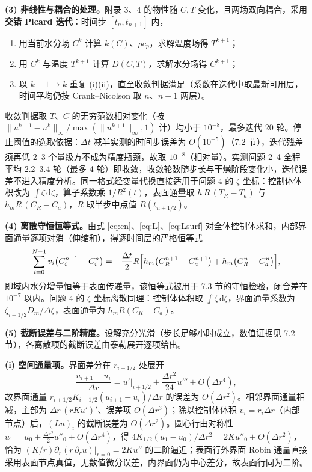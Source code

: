 \documentclass[12pt,a4paper]{ctexart}
\newcommand{\dd}{\,\mathrm{d}}
\begin{document}
\textbf{(3) 非线性与耦合的处理。}附录 3、4 的物性随 $C,T$ 变化，且两场双向耦合，采用\textbf{交错 Picard 迭代}：时间步 $[t_n,t_{n+1}]$ 内，
\begin{enumerate}[label=(\roman*),leftmargin=3em]
\item 用当前水分场 $C^{k}$ 计算 $k(C)$、$\rho c_p$，求解温度场得 $T^{k+1}$；
\item 用 $C^{k}$ 与温度 $T^{k+1}$ 计算 $D(C,T)$，求解水分场得 $C^{k+1}$；
\item 以 $k+1\to k$ 重复 (i)(ii)，直至收敛判据满足（系数在迭代中取最新可用层，时间平均仍按 Crank--Nicolson 取 $n$、$n+1$ 两层）。
\end{enumerate}
收敛判据取 $T$、$C$ 的无穷范数相对变化（按 $\|u^{k+1}-u^k\|_\infty/\max(\|u^{k+1}\|_\infty,1)$ 计）均小于 $10^{-8}$，最多迭代 20 轮。停止阈值的选取依据：$\Delta t$ 减半实测的时间步误差为 $O(10^{-5})$（7.2 节），迭代残差须再低 2--3 个量级方不成为精度瓶颈，故取 $10^{-8}$（相对量）。实测问题 2--4 全程平均 2.2--3.4 轮（最多 4 轮）即收敛，收敛轮数随步长与干燥阶段变化小，迭代误差不进入精度分析。同一格式经变量代换直接适用于问题 4 的 $\zeta$ 坐标：控制体体积改为 $\int\zeta\dd\zeta$，算子系数乘 $1/R^2(t)$，表面通量取 $h\,R\,(T_R-T_a)$ 与 $h_mR\,(C_R-C_a)$，$R$ 取半步中点值 $R(t_{n+1/2})$。

\textbf{(4) 离散守恒恒等式。}由式 \eqref{eq:cn}、\eqref{eq:L}、\eqref{eq:Lsurf} 对全体控制体求和，内部界面通量逐项对消（伸缩和），得逐时间层的严格恒等式
\begin{equation}
\sum_{i=0}^{N-1}v_i\bigl(C_i^{n+1}-C_i^n\bigr)
=-\frac{\Delta t}{2}R\Bigl[h_m\bigl(C_R^{n+1}-C_a^{n+1}\bigr)+h_m\bigl(C_R^n-C_a^n\bigr)\Bigr],
\label{eq:conserv}
\end{equation}
即域内水分增量恒等于表面传递量，该恒等式被用于 7.3 节的守恒检验，闭合差在 $10^{-7}$ 以内。问题 4 的 $\zeta$ 坐标离散同理：控制体体积取 $\int\zeta\dd\zeta$，界面通量系数为 $\zeta_{i\pm1/2}D_m/\Delta\zeta$，表面通量为 $h_mR(C_R-C_a)$。

\textbf{(5) 截断误差与二阶精度。}设解充分光滑（步长足够小时成立，数值证据见 7.2 节），各离散项的截断误差由泰勒展开逐项给出。

\textbf{(i) 空间通量项。}界面差分在 $r_{i+1/2}$ 处展开
\begin{equation}
\frac{u_{i+1}-u_i}{\Delta r}
=u'\Big|_{i+1/2}+\frac{\Delta r^2}{24}u'''+O(\Delta r^4),
\end{equation}
故界面通量 $r_{i+1/2}K_{i+1/2}(u_{i+1}-u_i)/\Delta r$ 的误差为 $O(\Delta r^2)$。相邻界面通量相减，主部为 $\Delta r\,(rKu')'$、误差项 $O(\Delta r^3)$；除以控制体体积 $v_i=r_i\Delta r$（内部节点）后，$(Lu)_i$ 的截断误差为 $O(\Delta r^2)$。圆心行由对称性 $u_1=u_0+\frac{\Delta r^2}{2}u''_0+O(\Delta r^4)$，得 $4K_{1/2}(u_1-u_0)/\Delta r^2=2Ku''_0+O(\Delta r^2)$，恰为 $(K/r)\partial_r(r\,\partial_r u)|_{r=0}=2Ku''$ 的二阶逼近；表面行外界面 Robin 通量直接采用表面节点真值，无数值微分误差，内界面仍为中心差分，故表面行同为二阶。
\end{document}
